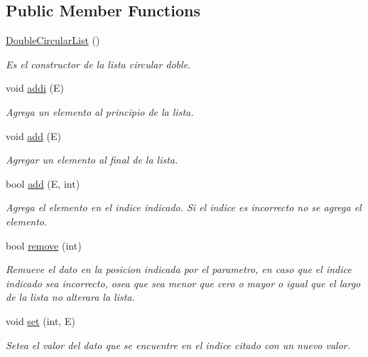 \subsection*{Public Member Functions}
\begin{DoxyCompactItemize}
\item 
\hyperlink{class_double_circular_list_a533876254e3c837d556542eda9968f8b}{Double\-Circular\-List} ()
\begin{DoxyCompactList}\small\item\em Es el constructor de la lista circular doble. \end{DoxyCompactList}\item 
void \hyperlink{class_double_circular_list_ade2ef68a86a8deef4cb43d38e031906b}{addi} (E)
\begin{DoxyCompactList}\small\item\em Agrega un elemento al principio de la lista. \end{DoxyCompactList}\item 
void \hyperlink{class_double_circular_list_a7691d38e77ea44d222c465f27e7d05b6}{add} (E)
\begin{DoxyCompactList}\small\item\em Agregar un elemento al final de la lista. \end{DoxyCompactList}\item 
bool \hyperlink{class_double_circular_list_a6d76f7045dd9997f55c6c2feb80678da}{add} (E, int)
\begin{DoxyCompactList}\small\item\em Agrega el elemento en el indice indicado. Si el indice es incorrecto no se agrega el elemento. \end{DoxyCompactList}\item 
bool \hyperlink{class_double_circular_list_ae7ed8b6714720cb7daafa639f232ecc3}{remove} (int)
\begin{DoxyCompactList}\small\item\em Remueve el dato en la posicion indicada por el parametro, en caso que el indice indicado sea incorrecto, osea que sea menor que cero o mayor o igual que el largo de la lista no alterara la lista. \end{DoxyCompactList}\item 
void \hyperlink{class_double_circular_list_a95e0f27bda1158233015ee3ff27b3ade}{set} (int, E)
\begin{DoxyCompactList}\small\item\em Setea el valor del dato que se encuentre en el indice citado con un nuevo valor. \end{DoxyCompactList}\item 

\end{DoxyCompactItemize}
